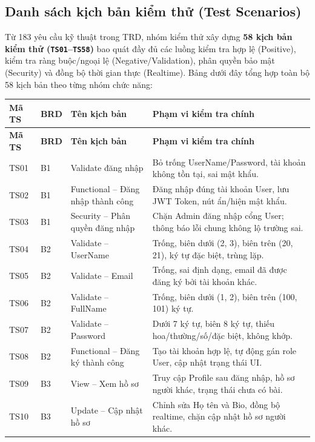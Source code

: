 \documentclass[11pt,a4paper]{article}
\begin{document}
\subsection{Danh sách kịch bản kiểm thử (Test Scenarios)}
Từ 183 yêu cầu kỹ thuật trong TRD, nhóm kiểm thử xây dựng \textbf{58 kịch bản kiểm thử (\texttt{TS01}--\texttt{TS58})} bao quát đầy đủ các luồng kiểm tra hợp lệ (Positive), kiểm tra ràng buộc/ngoại lệ (Negative/Validation), phân quyền bảo mật (Security) và đồng bộ thời gian thực (Realtime). Bảng dưới đây tổng hợp toàn bộ 58 kịch bản theo từng nhóm chức năng:

\begin{longtable}{|C{1.3cm}|C{1.2cm}|L{4.8cm}|L{8.5cm}|}
\hline
{}
\textbf{Mã TS} & \textbf{BRD} & \textbf{Tên kịch bản} & \textbf{Phạm vi kiểm tra chính} \tabularnewline
\hline
\endfirsthead
\hline
{}
\textbf{Mã TS} & \textbf{BRD} & \textbf{Tên kịch bản} & \textbf{Phạm vi kiểm tra chính} \tabularnewline
\hline
\endhead
\hline
\endfoot
TS01 & B1 & Validate đăng nhập & Bỏ trống UserName/Password, tài khoản không tồn tại, sai mật khẩu. \\ \hline
TS02 & B1 & Functional -- Đăng nhập thành công & Đăng nhập đúng tài khoản User, lưu JWT Token, nút ẩn/hiện mật khẩu. \\ \hline
TS03 & B1 & Security -- Phân quyền đăng nhập & Chặn Admin đăng nhập cổng User; thông báo lỗi chung không lộ trường sai. \\ \hline
TS04 & B2 & Validate -- UserName & Trống, biên dưới (2, 3), biên trên (20, 21), ký tự đặc biệt, trùng lặp. \\ \hline
TS05 & B2 & Validate -- Email & Trống, sai định dạng, email đã được đăng ký bởi tài khoản khác. \\ \hline
TS06 & B2 & Validate -- FullName & Trống, biên dưới (1, 2), biên trên (100, 101) ký tự. \\ \hline
TS07 & B2 & Validate -- Password & Dưới 7 ký tự, biên 8 ký tự, thiếu hoa/thường/số/đặc biệt, không khớp. \\ \hline
TS08 & B2 & Functional -- Đăng ký thành công & Tạo tài khoản hợp lệ, tự động gán role User, cập nhật trạng thái UI. \\ \hline
TS09 & B3 & View -- Xem hồ sơ & Truy cập Profile sau đăng nhập, hồ sơ người khác, trạng thái chưa có bài. \\ \hline
TS10 & B3 & Update -- Cập nhật hồ sơ & Chỉnh sửa Họ tên và Bio, đồng bộ realtime, chặn cập nhật hồ sơ người khác. \\ \hline

\end{longtable}
\end{document}
